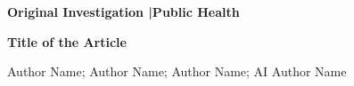 \documentclass[10pt, letterpaper]{article}
\begin{document}
\thispagestyle{firstpage}
\sloppy


{\sffamily\bfseries\fontsize{9}{11}\selectfont
  \textcolor{jamacrimson}{Original Investigation}%
  \textcolor{jamadarkgray}{\enspace|\enspace Public Health}%
}

\vspace{8pt}

{\sffamily\bfseries\fontsize{18}{21}\selectfont\color{jamadarkgray}
Title of the Article\par}

\vspace{8pt}

{\fontsize{9.5}{11.5}\selectfont\color{jamadarkgray}
Author Name; Author Name; Author Name; AI Author Name\par}

\vspace{12pt}


\noindent{\color{jamalightgray}\rule{\textwidth}{0.5pt}}
\vspace{6pt}
\end{document}
